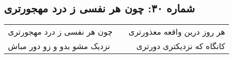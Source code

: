 \begin{center}
\section*{شماره ۳۰: چون هر نفسی ز درد مهجورتری}
\label{sec:030}
\begin{longtable}{l p{0.5cm} r}
چون هر نفسی ز درد مهجورتری
&&
هر روز درین واقعه معذورتری
\\
نزدیک مشو بدو و زو دور مباش
&&
کانگاه که نزدیکتری دورتری
\\
\end{longtable}
\end{center}
